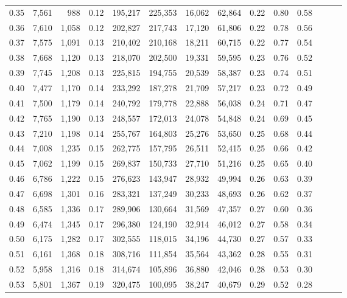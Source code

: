 \begin{tabular}{rrrrrrrrrrrrrr}
0.35 &  7,561 &    988 &  0.12 &  195,217 &  225,353 &  16,062 &  62,864 &  0.22 &  0.80 &      0.58 \\
0.36 &  7,610 &  1,058 &  0.12 &  202,827 &  217,743 &  17,120 &  61,806 &  0.22 &  0.78 &      0.56 \\
0.37 &  7,575 &  1,091 &  0.13 &  210,402 &  210,168 &  18,211 &  60,715 &  0.22 &  0.77 &      0.54 \\
0.38 &  7,668 &  1,120 &  0.13 &  218,070 &  202,500 &  19,331 &  59,595 &  0.23 &  0.76 &      0.52 \\
0.39 &  7,745 &  1,208 &  0.13 &  225,815 &  194,755 &  20,539 &  58,387 &  0.23 &  0.74 &      0.51 \\
0.40 &  7,477 &  1,170 &  0.14 &  233,292 &  187,278 &  21,709 &  57,217 &  0.23 &  0.72 &      0.49 \\
0.41 &  7,500 &  1,179 &  0.14 &  240,792 &  179,778 &  22,888 &  56,038 &  0.24 &  0.71 &      0.47 \\
0.42 &  7,765 &  1,190 &  0.13 &  248,557 &  172,013 &  24,078 &  54,848 &  0.24 &  0.69 &      0.45 \\
0.43 &  7,210 &  1,198 &  0.14 &  255,767 &  164,803 &  25,276 &  53,650 &  0.25 &  0.68 &      0.44 \\
0.44 &  7,008 &  1,235 &  0.15 &  262,775 &  157,795 &  26,511 &  52,415 &  0.25 &  0.66 &      0.42 \\
0.45 &  7,062 &  1,199 &  0.15 &  269,837 &  150,733 &  27,710 &  51,216 &  0.25 &  0.65 &      0.40 \\
0.46 &  6,786 &  1,222 &  0.15 &  276,623 &  143,947 &  28,932 &  49,994 &  0.26 &  0.63 &      0.39 \\
0.47 &  6,698 &  1,301 &  0.16 &  283,321 &  137,249 &  30,233 &  48,693 &  0.26 &  0.62 &      0.37 \\
0.48 &  6,585 &  1,336 &  0.17 &  289,906 &  130,664 &  31,569 &  47,357 &  0.27 &  0.60 &      0.36 \\
0.49 &  6,474 &  1,345 &  0.17 &  296,380 &  124,190 &  32,914 &  46,012 &  0.27 &  0.58 &      0.34 \\
0.50 &  6,175 &  1,282 &  0.17 &  302,555 &  118,015 &  34,196 &  44,730 &  0.27 &  0.57 &      0.33 \\
0.51 &  6,161 &  1,368 &  0.18 &  308,716 &  111,854 &  35,564 &  43,362 &  0.28 &  0.55 &      0.31 \\
0.52 &  5,958 &  1,316 &  0.18 &  314,674 &  105,896 &  36,880 &  42,046 &  0.28 &  0.53 &      0.30 \\
0.53 &  5,801 &  1,367 &  0.19 &  320,475 &  100,095 &  38,247 &  40,679 &  0.29 &  0.52 &      0.28 \\

\end{tabular}
